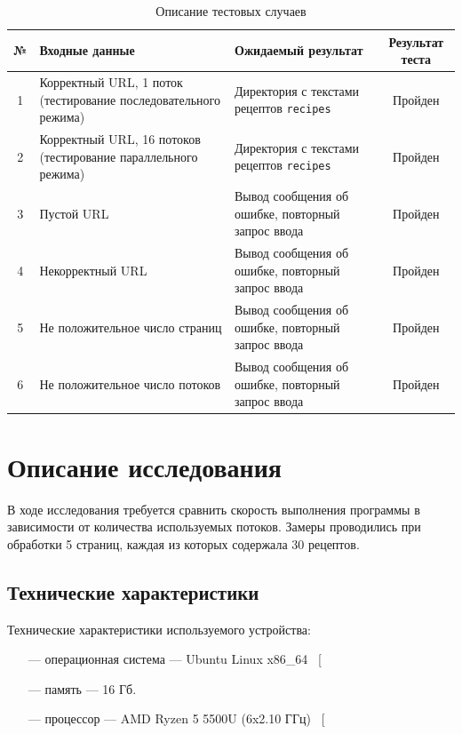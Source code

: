 \begin{table}[h!]
    \begin{center}
		\begin{threeparttable}
    \caption{Описание тестовых случаев}
    \captionsetup{justification=raggedright, singlelinecheck=false}
    \label{tbl:tests}
    \begin{tabular}{|c|p{6cm}|p{6cm}|c|}
        \hline
        \textbf{№} & \textbf{Входные данные} & \textbf{Ожидаемый результат} & \textbf{Результат теста} \\
        \hline
        1 & Корректный URL, 1 поток (тестирование последовательного режима) & Директория с текстами рецептов \texttt{recipes} & Пройден \\
        \hline
        2 & Корректный URL, 16 потоков (тестирование параллельного режима) & Директория с текстами рецептов \texttt{recipes} & Пройден \\
        \hline
        3 & Пустой URL & Вывод сообщения об ошибке, повторный запрос ввода & Пройден \\
        \hline
        4 & Некорректный URL & Вывод сообщения об ошибке, повторный запрос ввода & Пройден \\
        \hline
        5 & Не положительное число страниц & Вывод сообщения об ошибке, повторный запрос ввода & Пройден \\
        \hline
        6 & Не положительное число потоков & Вывод сообщения об ошибке, повторный запрос ввода & Пройден \\
        \hline
    \end{tabular}
    \end{threeparttable}
    \end{center}
\end{table}




\chapter{Описание исследования}
В ходе исследования требуется сравнить скорость выполнения программы в зависимости от количества используемых потоков. Замеры проводились при обработки 5 страниц, каждая из которых содержала 30 рецептов.

\section{Технические характеристики}
Технические характеристики используемого устройства:
\begin{itemize}
    \item[---] операционная система --- Ubuntu Linux x86\_64 ~[\cite{Ubuntu}
    \item[---] память --- 16 Гб.
    \item[---] процессор --- AMD Ryzen 5 5500U (6x2.10 ГГц) ~[\cite{AMD}
\end{itemize}

